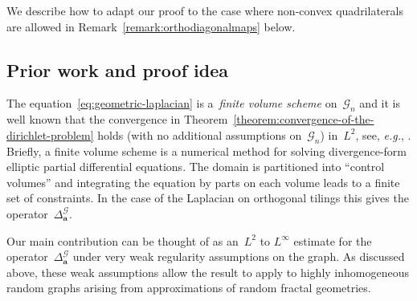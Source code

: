 \documentclass[12pt]{amsart}
\numberwithin{equation}{section}
\DeclareMathOperator{\C}{\mathbb{C}}
\newcommand{\eg}{{\it e.g.}}
\newcommand{\G}{\mathcal{G}}
\newcommand{\V}{\mathcal{V}}
\newcommand{\E}{\mathcal{E}}
\newcommand{\aDelta}{\hyperref[eq:geometric-laplacian]{{\Delta^{\mathcal{G}}_{\cond}}}}
\newcommand{\cond}{\hyperref[eq:geometric-laplacian]{\mathbf{a}}}
\begin{document}



We describe how to adapt our proof to the case where non-convex quadrilaterals are allowed in Remark~\ref{remark:orthodiagonalmaps} below.




\subsection{Prior work and proof idea}
\label{subsec:prior}

The equation~\eqref{eq:geometric-laplacian} is a~\emph{finite volume scheme} on~$\G_n$ and it is well known that the convergence in Theorem~\ref{theorem:convergence-of-the-dirichlet-problem} holds (with no additional assumptions on~$\G_n$) in~$L^2$, see, \eg, \cite[Theorem 9.3]{eymard2000finite}. Briefly, a finite volume scheme is a numerical method for solving divergence-form elliptic partial differential equations. The domain is partitioned into ``control volumes'' and integrating the equation by parts
on each volume leads to a finite set of constraints. In the case of the Laplacian on orthogonal tilings this gives the operator~$\aDelta$. 

 Our main contribution can be thought of as an~$L^2$ to $L^{\infty}$ estimate for the operator~$\aDelta$ under very weak regularity assumptions on the graph.  As discussed above, these weak assumptions allow the result to apply to highly inhomogeneous random graphs arising from approximations of random fractal geometries. 
\end{document}

